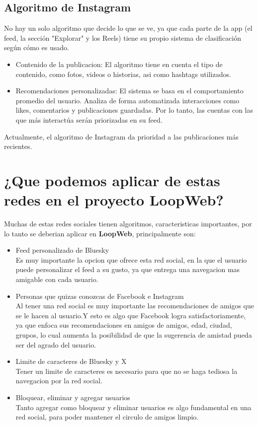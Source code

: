 \subsection*{Algoritmo de Instagram}
No hay un solo algoritmo que decide lo que se ve, ya que cada parte de la app (el feed, la sección "Explorar" y los Reels) tiene su propio sistema de clasificación según cómo es usado.
\begin{itemize}
    \item Contenido de la publicacion:
    El algoritmo tiene en cuenta el tipo de contenido, como fotos, videos o historias, asi como hashtags utilizados.
    \item Recomendaciones personalizadas:
    El sistema se basa en el comportamiento promedio del usuario. Analiza de forma automatizada interacciones como likes, comentarios y publicaciones guardadas. 
    Por lo tanto, las cuentas con las que más interactúa serán priorizadas en su feed. 
\end{itemize}
Actualmente, el algoritmo de Instagram da prioridad a las publicaciones más recientes.

\section{{\textbf{¿Que podemos aplicar de estas redes en el proyecto LoopWeb?}}}
Muchas de estas redes sociales tienen algoritmos, caracteristicas importantes, por lo tanto se deberian aplicar en \textbf{LoopWeb}, principalmente son:
\begin{itemize}
    \item Feed personalizado de Bluesky\\
        Es muy importante la opcion que ofrece esta red social, en la que el usuario puede personalizar el feed a su gusto, ya que entrega una navegacion mas amigable con cada usuario.
    \item Personas que quizas conozcas de Facebook e Instagram\\
        Al tener una red social es muy importante las recomendaciones de amigos que se le hacen al usuario.Y esto es algo que Facebook logra satisfactoriamente, ya que enfoca sus recomendaciones en amigos de amigos, edad, ciudad, grupos, lo cual 
        aumenta la posibilidad de que la sugerencia de amistad pueda ser del agrado del usuario.
    \item Limite de caracteres de Bluesky y X\\
        Tener un limite de caracteres es necesario para que no se haga tediosa la navegacion por la red social.
    \item Bloquear, eliminar y agregar usuarios\\
        Tanto agregar como bloquear y eliminar usuarios es algo fundamental en una red social, para poder mantener el circulo de amigos limpio.
\end{itemize}

